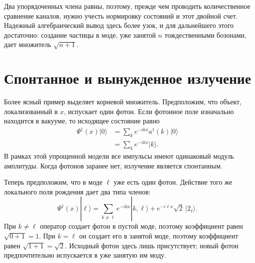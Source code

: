 Два упорядоченных члена равны, поэтому, прежде чем проводить количественное сравнение каналов, нужно учесть нормировку состояний и этот двойной счет. Надежный алгебраический вывод здесь более узок, и для дальнейшего этого достаточно: создание частицы в моде, уже занятой \(n\) тождественными бозонами, дает множитель \(\sqrt{n+1}\).

\section{Спонтанное и вынужденное излучение}

Более ясный пример выделяет корневой множитель. Предположим, что объект, локализованный в \(x\), испускает один фотон. Если фотонное поле изначально находится в вакууме, то исходящее состояние равно
\begin{align}
\Psi^\dagger(x)|0\rangle
&=\sum_k e^{-ikx}a^\dagger(k)|0\rangle\\
&=\sum_k e^{-ikx}|k\rangle.
\end{align}
В рамках этой упрощенной модели все импульсы имеют одинаковый модуль амплитуды. Когда фотонов заранее нет, излучение является спонтанным.

Теперь предположим, что в моде \(\ell\) уже есть один фотон. Действие того же локального поля рождения дает два типа членов:
\begin{equation}
\Psi^\dagger(x)|\ell\rangle
=
\sum_{k\ne\ell}e^{-ikx}|k,\ell\rangle
+e^{-i\ell x}\sqrt{2}\,|2_\ell\rangle.
\end{equation}
При \(k\ne\ell\) оператор создает фотон в пустой моде, поэтому коэффициент равен \(\sqrt{0+1}=1\). При \(k=\ell\) он создает его в занятой моде, поэтому коэффициент равен \(\sqrt{1+1}=\sqrt{2}\). Исходный фотон здесь лишь присутствует; новый фотон предпочтительно испускается в уже занятую им моду.

\begin{classroomqa}
\end{classroomqa}

